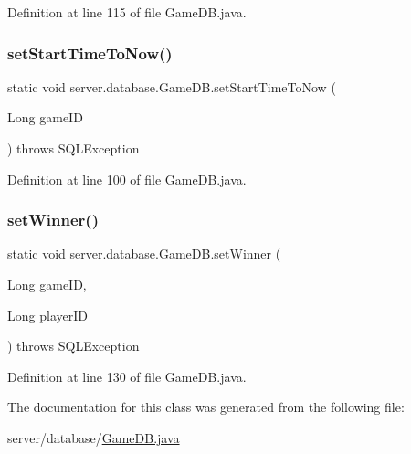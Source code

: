 Definition at line 115 of file Game\+D\+B.\+java.

\hypertarget{classserver_1_1database_1_1_game_d_b_a399d52aa4d6f47bd4024568835f35007}{}\label{classserver_1_1database_1_1_game_d_b_a399d52aa4d6f47bd4024568835f35007} 
\subsubsection{\texorpdfstring{set\+Start\+Time\+To\+Now()}{setStartTimeToNow()}}
{\footnotesize\ttfamily static void server.\+database.\+Game\+D\+B.\+set\+Start\+Time\+To\+Now (\begin{DoxyParamCaption}\item[{Long}]{game\+ID }\end{DoxyParamCaption}) throws S\+Q\+L\+Exception\hspace{0.3cm}{\ttfamily [static]}}



Definition at line 100 of file Game\+D\+B.\+java.

\hypertarget{classserver_1_1database_1_1_game_d_b_ae64f3d1aca34959c83a73dbb5da7f82b}{}\label{classserver_1_1database_1_1_game_d_b_ae64f3d1aca34959c83a73dbb5da7f82b} 
\subsubsection{\texorpdfstring{set\+Winner()}{setWinner()}}
{\footnotesize\ttfamily static void server.\+database.\+Game\+D\+B.\+set\+Winner (\begin{DoxyParamCaption}\item[{Long}]{game\+ID,  }\item[{Long}]{player\+ID }\end{DoxyParamCaption}) throws S\+Q\+L\+Exception\hspace{0.3cm}{\ttfamily [static]}}



Definition at line 130 of file Game\+D\+B.\+java.



The documentation for this class was generated from the following file\+:\begin{DoxyCompactItemize}
\item 
server/database/\hyperlink{_game_d_b_8java}{Game\+D\+B.\+java}\end{DoxyCompactItemize}
